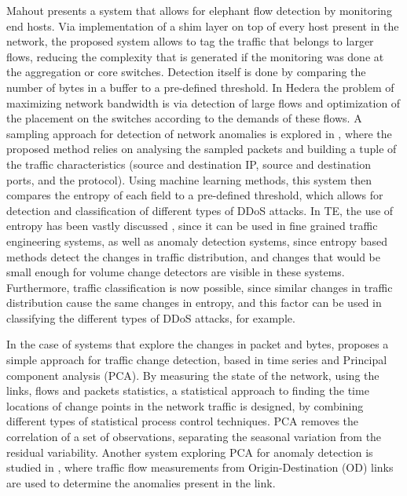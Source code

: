 \par Mahout \cite{curtis_mahout:_2011} presents a system that allows for elephant flow detection by monitoring end hosts. Via implementation of a shim layer on top
of every host present in the network, the proposed system allows to tag the traffic that belongs to larger flows, reducing the complexity that is generated 
if the monitoring was done at the aggregation or core switches. Detection itself is done by comparing the number of bytes in a buffer to a pre-defined threshold.
In Hedera \cite{al-fares_hedera:_2010} the problem of maximizing network bandwidth is via detection of large flows and optimization of the placement on the 
switches according to the demands of these flows. A sampling approach for detection of network anomalies is explored in \cite{jun_ddos_2014}, where the 
proposed method relies on analysing the sampled packets and building a tuple of the traffic characteristics (source and destination IP, source and 
destination ports, and the protocol). Using machine learning methods, this system then compares the entropy of each field to a pre-defined threshold, which
allows for detection and classification of different types of DDoS attacks. In TE, the use of entropy has been vastly discussed \cite{brauckhoff_impact_2006,
lall_data_2006}, since it can be used in fine grained traffic engineering systems, as well as anomaly detection systems, since entropy based methods
detect the changes in traffic distribution, and changes that would be small enough for volume change detectors are visible in these systems. Furthermore, traffic
classification is now possible, since similar changes in traffic distribution cause the same changes in entropy, and this factor can be used in classifying the 
different types of DDoS attacks, for example.

\par In the case of systems that explore the changes in packet and bytes, \cite{munz_traffic_2010} proposes a simple approach for traffic change detection, based in
time series and Principal component analysis (PCA). By measuring the state of the network, using the links, flows and packets statistics, a statistical approach to 
finding the time locations of change points in the network traffic is designed, by combining different types of statistical process control techniques.
PCA removes the correlation of a set of observations, separating the seasonal variation from the residual variability. Another system exploring PCA for anomaly
detection is studied in \cite{lakhina_characterization_2004}, where traffic flow measurements from Origin-Destination (OD) links are used to determine the anomalies
present in the link. 

